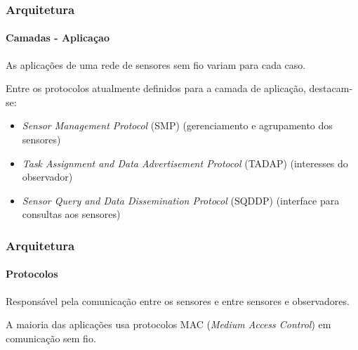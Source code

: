 \documentclass[notes]{beamer}
\begin{document}
\begin{frame}
\frametitle{Arquitetura}
\framesubtitle{Camadas - Aplicaçao}

\begin{block}

As aplicações de uma rede de sensores sem fio variam para cada caso.

\end{block} \pause

\begin{block}

Entre os protocolos atualmente definidos para a camada de aplicação, destacam-se: \pause

\begin{itemize}

\item \textit{Sensor Management Protocol} (SMP) (gerenciamento e agrupamento dos sensores) \pause
\item \textit{Task Assignment and Data Advertisement Protocol}   (TADAP) (interesses do observador) \pause
\item \textit{Sensor Query and Data Dissemination Protocol} (SQDDP) (interface para consultas aos sensores)

\end{itemize}

\end{block}

\end{frame}

\begin{frame}
\frametitle{Arquitetura}
\framesubtitle{Protocolos}

\begin{block}

Responsável pela comunicação entre os sensores e entre sensores e observadores. 
\end{block} \pause

\begin{block}

A maioria das aplicações usa protocolos MAC (\textit{Medium Access Control}) em comunicação sem fio. 

\end{block}

\end{frame}
\end{document}
